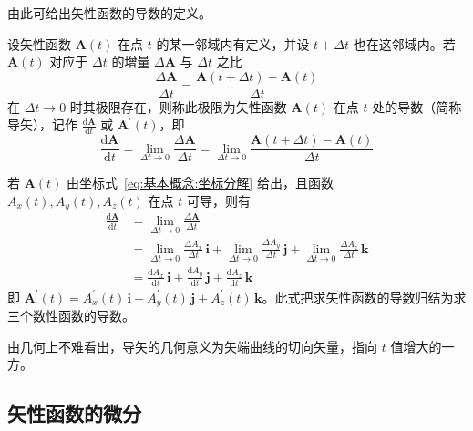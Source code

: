 由此可给出矢性函数的导数的定义。

\begin{definition}[矢性函数的导数]
	设矢性函数 $\boldsymbol{A}(t)$ 在点 $t$ 的某一邻域内有定义，并设 $t+\Delta t$ 也在这邻域内。若 $\boldsymbol{A}(t)$ 对应于 $\Delta t$ 的增量 $\Delta\boldsymbol{A}$ 与 $\Delta t$ 之比
	\begin{equation}
		\label{eq:导数:差商}
		\frac{\Delta\boldsymbol{A}}{\Delta t}
		=\frac{\boldsymbol{A}(t+\Delta t)-\boldsymbol{A}(t)}{\Delta t}
	\end{equation}
	在 $\Delta t\rightarrow 0$ 时其极限存在，则称此极限为矢性函数 $\boldsymbol{A}(t)$ 在点 $t$ 处的导数（简称导矢），记作 $\frac{\mathrm{d}\boldsymbol{A}}{\mathrm{d}t}$ 或 $\boldsymbol{A}^{\prime}(t)$，即
	\begin{equation}
		\label{eq:导数:定义}
		\frac{\mathrm{d}\boldsymbol{A}}{\mathrm{d}t}
		=\lim_{\Delta t\rightarrow 0}\frac{\Delta\boldsymbol{A}}{\Delta t}
		=\lim_{\Delta t\rightarrow 0}\frac{\boldsymbol{A}(t+\Delta t)-\boldsymbol{A}(t)}{\Delta t}
	\end{equation}
\end{definition}

若 $\boldsymbol{A}(t)$ 由坐标式~\eqref{eq:基本概念:坐标分解} 给出，且函数 $A_{x}(t),A_{y}(t),A_{z}(t)$ 在点 $t$ 可导，则有
\begin{equation}
	\label{eq:导数:坐标表示}
	\begin{aligned}
		\frac{\mathrm{d}\boldsymbol{A}}{\mathrm{d}t}
		&=\lim_{\Delta t\rightarrow 0}\frac{\Delta\boldsymbol{A}}{\Delta t}\\
		&=\lim_{\Delta t\rightarrow 0}\frac{\Delta A_{x}}{\Delta t}\,\mathbf{i}
		+\lim_{\Delta t\rightarrow 0}\frac{\Delta A_{y}}{\Delta t}\,\mathbf{j}
		+\lim_{\Delta t\rightarrow 0}\frac{\Delta A_{z}}{\Delta t}\,\mathbf{k}\\
		&=\frac{\mathrm{d}A_{x}}{\mathrm{d}t}\,\mathbf{i}
		+\frac{\mathrm{d}A_{y}}{\mathrm{d}t}\,\mathbf{j}
		+\frac{\mathrm{d}A_{z}}{\mathrm{d}t}\,\mathbf{k}
	\end{aligned}
\end{equation}
即 $\boldsymbol{A}^{\prime}(t)=A_{x}^{\prime}(t)\,\mathbf{i}+A_{y}^{\prime}(t)\,\mathbf{j}+A_{z}^{\prime}(t)\,\mathbf{k}$。此式把求矢性函数的导数归结为求三个数性函数的导数。

由几何上不难看出，导矢的几何意义为矢端曲线的切向矢量，指向 $t$ 值增大的一方。

\subsection{矢性函数的微分}

